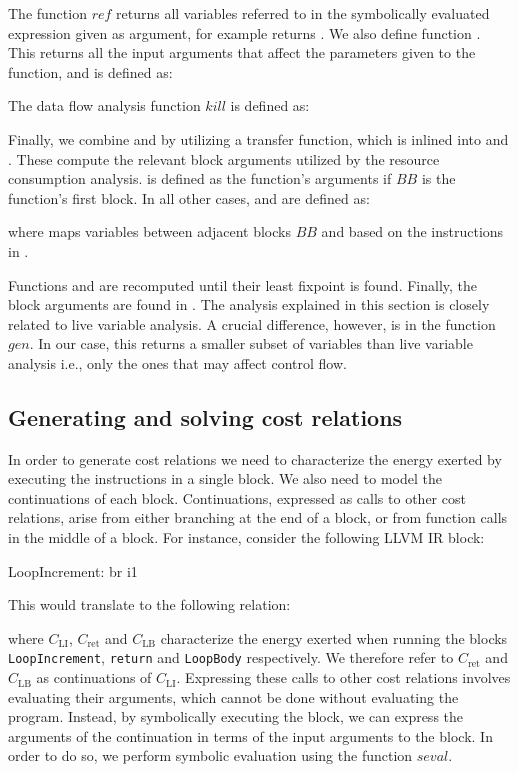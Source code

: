 \documentclass[9pt,preprint]{sigplanconf}
\newcommand{\mathspace}[1]{\ensuremath{#1}\xspace}
\newcommand{\CR}[1]{\mathspace{C_{\operatorname{#1}}}}
\newcommand{\aBlock}{\mathspace{\mathit{BB}}}
\newcommand{\Gen}{\mathspace{\mathit{gen}}}
\newcommand{\Kill}{\mathspace{\mathit{kill}}}
\newcommand{\seval}{\mathspace{\mathit{seval}}}
\newcommand{\Ref}{\mathspace{\mathit{ref}}}
\newcommand{\seclabel}[1]{\label{sec:#1}}
\begin{document}
The function \Ref returns all variables referred to in the symbolically
evaluated expression given as argument, for example  returns
. We also define function . This returns all the input
arguments that affect the parameters given to the function, and is defined as:



\noindent
The data flow analysis function \Kill is defined as:


Finally, we combine  and  by utilizing a transfer function, which
is inlined into  and . These compute the relevant block
arguments utilized by the resource consumption analysis.  is defined as
the function's arguments if \aBlock is the function's first block. In all other
cases,  and  are defined as:

where  maps variables between adjacent blocks \aBlock and 
based on the  instructions in .

Functions  and  are recomputed until their
least fixpoint is found. Finally, the block arguments are found in .
The analysis explained in this section is closely related to live variable
analysis. A crucial difference, however, is in the function \Gen. In our case,
this returns a smaller subset of variables than live variable analysis i.e.,
only the ones that may affect control flow.

\subsection{Generating and solving cost relations}
\seclabel{CRs}
In order to generate cost relations we
need to characterize the energy exerted by executing the instructions in a
single block. We also need to model the continuations of each
block. Continuations, expressed as calls to other cost relations, arise from
either branching at the end of a block, or from function calls in the middle of a
block. For instance, consider the following LLVM IR block:

\begin{llvmcode}
  LoopIncrement:
br i1 \end{llvmcode}

\noindent This would translate to the following relation:

where \CR{LI}, \CR{ret} and \CR{LB} characterize the energy exerted when running the blocks
\texttt{LoopIncrement}, \texttt{return} and \texttt{LoopBody}
respectively. We therefore refer to \CR{ret} and \CR{LB} as continuations of
\CR{LI}. Expressing these calls to other cost relations involves evaluating
their arguments, which cannot be done without evaluating the
program. Instead, by symbolically executing the block, we can express the
arguments of the continuation in terms of the input arguments to the block. In
order to do so, we perform symbolic evaluation using the function \seval.
\end{document}

